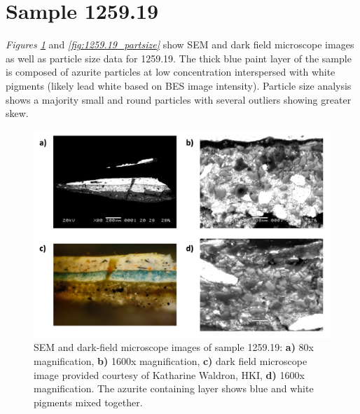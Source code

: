 \section{Sample 1259.19}

\textit{Figures \ref{fig:1259.19_imgs}} and \textit{\ref{fig:1259.19_partsize}} show SEM and dark field microscope images as well as particle size data for 1259.19. The thick blue paint layer of the sample is composed of azurite particles at low concentration interspersed with white pigments (likely lead white based on BES image intensity). Particle size analysis shows a majority small and round particles with several outliers showing greater skew. 


\begin{figure}[H]
  \centering
  \includegraphics[width=\linewidth]{1259-19_imgs}
\caption[SEM and dark-field microscope images of sample 1259.19.]{SEM and dark-field microscope images of sample 1259.19: \textbf{a)} 80x magnification, \textbf{b)} 1600x magnification, \textbf{c)} dark field microscope image provided courtesy of Katharine Waldron, HKI, \textbf{d)} 1600x magnification. The azurite containing layer shows blue and white pigments mixed together.}
\label{fig:1259.19_imgs}
\end{figure}

